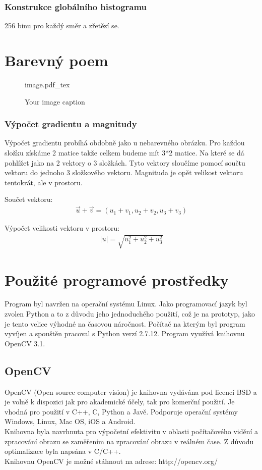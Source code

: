 \documentclass{report}
\begin{document}
\subsection{Konstrukce globálního histogramu}
256 binu pro každý směr a zřetězí se.

\chapter{Barevný poem}

\begin{figure}[!ht]
    \centering    
    \def\svgwidth{\columnwidth}
	{image.pdf_tex}    
    \caption{Your image caption}
    \label{fig:your image label}
\end{figure}


\subsection{Výpočet gradientu a magnitudy}
Výpočet gradientu probíhá obdobně jako u nebarevného obrázku. Pro každou složku získáme 2 matice takže celkem budeme mít 3*2 matice.
Na které se dá pohlížet jako na 2 vektory o 3 složkách. Tyto vektory sloučíme pomocí součtu vektoru do jednoho 3 složkového vektoru. Magnituda je opět velikost vektoru tentokrát, ale v prostoru. 

Součet vektoru:
\begin{align}
   \label{soucet_vektrou} \vec{u} + \vec{v} = (u_1 + v_1, u_2 + v_2, u_3 + v_3 )
\end{align} 


Výpočet velikosti vektoru v prostoru:
\begin{align}
   \label{velikost_vektoru_v_prostoru} |u| = \sqrt{u_1^2 + u_2^2 + u_3^2}
\end{align} 


 

\chapter{Použité programové prostředky}
Program byl navržen na operační systému Linux. Jako programovací jazyk byl zvolen Python a to z důvodu jeho jednoduchého použití, což je na prototyp, jako je tento velice výhodné na časovou náročnost. Počítač na kterým byl program vyvíjen a spouštěn pracoval s Python verzí 2.7.12. Program využívá knihovnu OpenCV 3.1. 
  
\section{OpenCV}
OpenCV (Open source computer vision) je knihovna vydávána pod licencí BSD a je volně k dispozici jak pro akademické účely, tak pro komerční použití. Je vhodná pro použití v C++, C, Python a Javě. Podporuje operační systémy Windows, Linux, Mac OS, iOS a Android.
\\
Knihovna byla navrhnuta pro výpočetní efektivitu v oblasti počítačového vidění a zpracování obrazu se zaměřením na zpracování obrazu v reálném čase. Z důvodu optimalizace byla napsána v C/C++. 
\\
Knihovnu OpenCV je možné stáhnout na adrese: http://opencv.org/  
\end{document}
